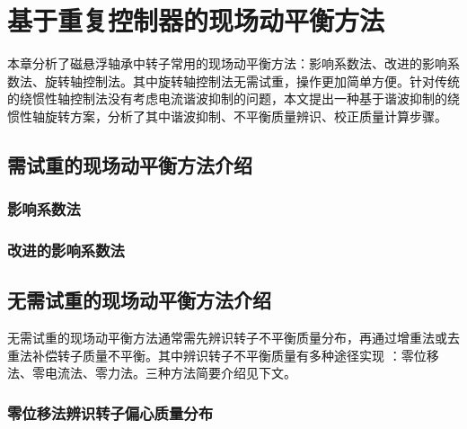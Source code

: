 \chapter{基于重复控制器的现场动平衡方法}
本章分析了磁悬浮轴承中转子常用的现场动平衡方法：影响系数法、改进的影响系数法、旋转轴控制法。其中旋转轴控制法无需试重，操作更加简单方便。针对传统的绕惯性轴控制法没有考虑电流谐波抑制的问题，本文提出一种基于谐波抑制的绕惯性轴旋转方案，分析了其中谐波抑制、不平衡质量辨识、校正质量计算步骤。
\section{需试重的现场动平衡方法介绍}
\subsection{影响系数法}

\subsection{改进的影响系数法}

\section{无需试重的现场动平衡方法介绍}
无需试重的现场动平衡方法通常需先辨识转子不平衡质量分布，再通过增重法或去重法补偿转子质量不平衡。其中辨识转子不平衡质量有多种途径实现
：零位移法、零电流法、零力法。三种方法简要介绍见下文。

\subsection{零位移法辨识转子偏心质量分布}


